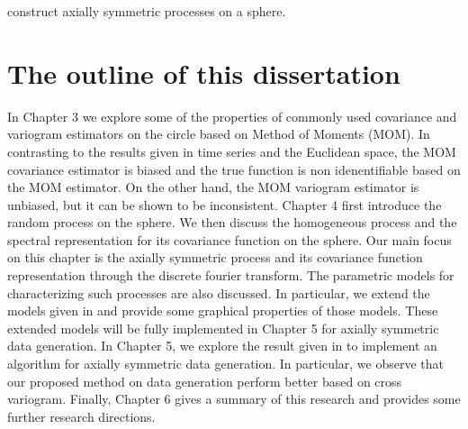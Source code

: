 construct axially symmetric processes on a sphere.


\section{The outline of this dissertation}
In Chapter 3 we explore some of the properties of commonly used covariance and variogram estimators on the circle based on Method of Moments (MOM). In contrasting to the results given in time series and the Euclidean space, the MOM covariance estimator is biased and the true \cov function is non idenentifiable based on the MOM estimator. On the other hand, the MOM variogram estimator is unbiased, but it can be shown to be inconsistent. Chapter 4 first introduce the random process on the sphere. We then discuss the homogeneous process and the spectral representation for its covariance function on the sphere. Our main focus on this chapter is the axially symmetric process and its covariance function representation through the discrete fourier transform. The parametric models for characterizing such processes are also discussed. In particular, we extend the models given in \cite{Huang2012} and provide some graphical properties of those models. These extended models will be fully implemented in Chapter 5 for axially symmetric data generation. In Chapter 5, we explore the result given in \cite{Huang2012} to implement an algorithm for axially symmetric data generation. In particular, we observe that our proposed method on data generation perform better based on cross variogram. Finally, Chapter 6 gives a summary of this research and provides some further research directions.   



